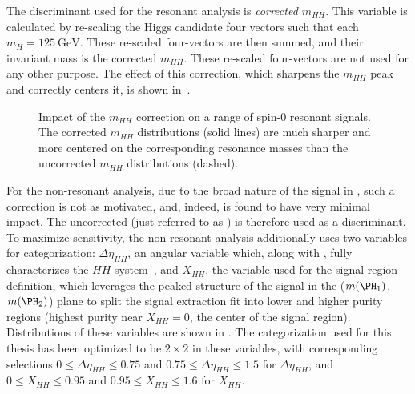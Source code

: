The discriminant used for the resonant analysis is \emph{corrected $m_{HH}$}. This
variable is calculated by re-scaling the Higgs candidate four vectors such that
each $m_{H} = \SI{125}{\GeV}$. These re-scaled four-vectors are then summed, and
their invariant mass is the corrected $m_{HH}$. These re-scaled four-vectors are
not used for any other purpose. The effect of this correction, which sharpens
the $m_{HH}$ peak and correctly centers it, is shown
in~\Fig{\ref{fig:m-hh-cor-effect}}.
\begin{figure}[ht]
\centering
{}
\caption{\label{fig:m-hh-cor-effect} Impact of the $m_{HH}$ correction on a range of spin-0 
resonant signals. The corrected $m_{HH}$ distributions (solid lines) are much sharper and 
more centered on the corresponding resonance masses than the uncorrected $m_{HH}$ distributions 
(dashed).}
\end{figure}

For the non-resonant analysis, due to the broad nature of the signal in \mhh, such a 
correction is not as motivated, and, indeed, is found to have very minimal 
impact. The uncorrected \mhh (just referred to as \mhh) is therefore used 
as a discriminant. To maximize sensitivity, the non-resonant analysis 
additionally uses two variables for categorization: $\Delta \eta_{HH}$, an angular 
variable which, along with \mhh, fully characterizes the $HH$ system~\cite{cosThetastar}, 
and $X_{HH}$, the variable used for the 
signal region definition, which leverages the peaked structure of the 
signal in the ($\mh1$, $\mh2$) plane to split the signal extraction fit into lower and higher
purity regions (highest purity near $X_{HH} = 0$, the center of the signal region).
Distributions of these variables are shown in . The categorization used for this 
thesis has been optimized to be $2\times 2$ in these variables, with corresponding selections 
$0 \leq \Delta \eta_{HH} \leq 0.75$ and $0.75 \leq \Delta \eta_{HH} \leq 1.5$ for $\Delta \eta_{HH}$, 
and $0 \leq X_{HH} \leq 0.95$ and $0.95 \leq X_{HH} \leq 1.6$ for $X_{HH}$.
